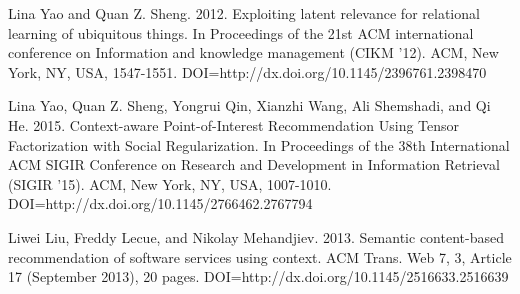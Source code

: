 \documentclass[]{report}
\begin{document}
\begin{thebibliography}{99}
Lina Yao and Quan Z. Sheng. 2012. Exploiting latent relevance for relational learning of ubiquitous things. In Proceedings of the 21st ACM international conference on Information and knowledge management (CIKM '12). ACM, New York, NY, USA, 1547-1551. DOI=http://dx.doi.org/10.1145/2396761.2398470

Lina Yao, Quan Z. Sheng, Yongrui Qin, Xianzhi Wang, Ali Shemshadi, and Qi He. 2015. Context-aware Point-of-Interest Recommendation Using Tensor Factorization with Social Regularization. In Proceedings of the 38th International ACM SIGIR Conference on Research and Development in Information Retrieval (SIGIR '15). ACM, New York, NY, USA, 1007-1010. DOI=http://dx.doi.org/10.1145/2766462.2767794

Liwei Liu, Freddy Lecue, and Nikolay Mehandjiev. 2013. Semantic content-based recommendation of software services using context. ACM Trans. Web 7, 3, Article 17 (September 2013), 20 pages. DOI=http://dx.doi.org/10.1145/2516633.2516639



\end{thebibliography}
\end{document}

